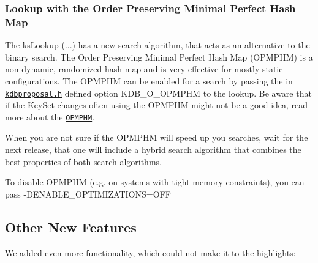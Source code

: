 \subsubsection*{Lookup with the Order Preserving Minimal Perfect Hash Map}

The {\ttfamily ks\+Lookup (...)} has a new search algorithm, that acts as an alternative to the binary search. The Order Preserving Minimal Perfect Hash Map (O\+P\+M\+P\+HM) is a non-\/dynamic, randomized hash map and is very effective for mostly static configurations. The O\+P\+M\+P\+HM can be enabled for a search by passing the in \href{https://github.com/ElektraInitiative/libelektra/blob/master/src/include/kdbproposal.h}{\tt kdbproposal.\+h} defined option {\ttfamily K\+D\+B\+\_\+\+O\+\_\+\+O\+P\+M\+P\+HM} to the lookup. Be aware that if the Key\+Set changes often using the O\+P\+M\+P\+HM might not be a good idea, read more about the \href{https://github.com/ElektraInitiative/libelektra/blob/master/doc/dev/data-structures.md#order-preserving-minimal-perfect-hash-map-aka-opmphm}{\tt O\+P\+M\+P\+HM}.

When you are not sure if the O\+P\+M\+P\+HM will speed up you searches, wait for the next release, that one will include a hybrid search algorithm that combines the best properties of both search algorithms.

To disable O\+P\+M\+P\+HM (e.\+g. on systems with tight memory constraints), you can pass {\ttfamily -\/\+D\+E\+N\+A\+B\+L\+E\+\_\+\+O\+P\+T\+I\+M\+I\+Z\+A\+T\+I\+O\+NS=O\+FF}

\subsection*{Other New Features}

We added even more functionality, which could not make it to the highlights\+:


